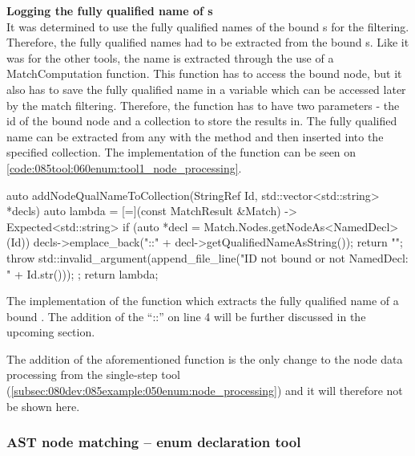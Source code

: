 \textbf{Logging the fully qualified name of s}\\
It was determined to use the fully qualified names of the bound s for the filtering. 
Therefore, the fully qualified names had to be extracted from the bound s. 
Like it was for the other tools, the name is extracted through the use of a MatchComputation function. 
This function has to access the bound  node, but it also has to save the fully qualified name in a variable which can be accessed later by the match filtering. 
Therefore, the function has to have two parameters - the id of the bound node and a collection to store the results in. 
The fully qualified name can be extracted from any  with the method  and then inserted into the specified collection. 
The implementation of the function can be seen on \cref{code:085tool:060enum:tool1_node_processing}.

\begin{listing}[H]
  \begin{cppcode}
auto addNodeQualNameToCollection(StringRef Id, std::vector<std::string> *decls) {
	auto lambda = [=](const MatchResult &Match) -> Expected<std::string> {
		if (auto *decl = Match.Nodes.getNodeAs<NamedDecl>(Id)) {
			decls->emplace_back("::" + decl->getQualifiedNameAsString());
			return "";
		}
		throw std::invalid_argument(append_file_line("ID not bound or not NamedDecl: " + Id.str()));
	};
	return lambda;
}
  \end{cppcode}
  \caption{The implementation of the function which extracts the fully qualified name of a bound . The addition of the ``::'' on line 4 will be further discussed in the upcoming section.}
  \label{code:085tool:060enum:tool1_node_processing}
\end{listing}

The addition of the aforementioned  function is the only change to the node data processing from the single-step tool (\cref{subsec:080dev:085example:050enum:node_processing}) and it will therefore not be shown here.


\subsubsection*{AST node matching -- enum declaration tool} \label{subsubsec:080dev:085examples:060enum:matching_second_tool}


